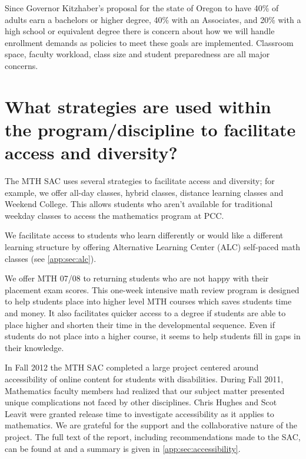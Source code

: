 Since Governor Kitzhaber's proposal for the state of Oregon to have 40\% of
adults earn a bachelors or higher degree, 40\% with an Associates, and 20\%
with a high school or equivalent degree there is concern about how we will handle
enrollment demands as policies to meet these goals are implemented.
Classroom space, faculty workload, class size and student preparedness are all
major concerns.

\section{What strategies are used within the program/discipline to facilitate access and diversity?}
The MTH SAC uses several strategies to facilitate access and diversity; for
example, we offer all-day classes, hybrid classes, distance learning classes
and Weekend College. This allows students who aren't available for traditional
weekday classes to access the mathematics program at PCC. 

We facilitate access to students who learn differently or would like a
different learning structure by offering  Alternative Learning Center (ALC)
self-paced math classes (see \vref{app:sec:alc}).

We offer MTH 07/08  to returning students who are not happy with their
placement exam scores. This one-week intensive math review program is designed
to help students place into higher level MTH courses which saves students time
and money. It also facilitates quicker access to a degree if students are able
to place higher and shorten their time in the developmental sequence.  Even if
students do not place into a higher course, it seems to help students fill in
gaps in their knowledge.

In Fall 2012 the MTH SAC completed a large project centered around accessibility of online content
for students with disabilities. During Fall 2011, Mathematics faculty members 
had realized that our subject matter presented unique complications not faced by other
disciplines. Chris Hughes and Scot Leavit were granted release time to
investigate accessibility as it applies to mathematics. We are grateful for the
support and the collaborative nature of the project.\label{needs:page:disabilityservices} 
The full text of the report, including recommendations made to the SAC, can be found at
\cite{accessibilityproject} and a summary is given in
\vref{app:sec:accessibility}.

